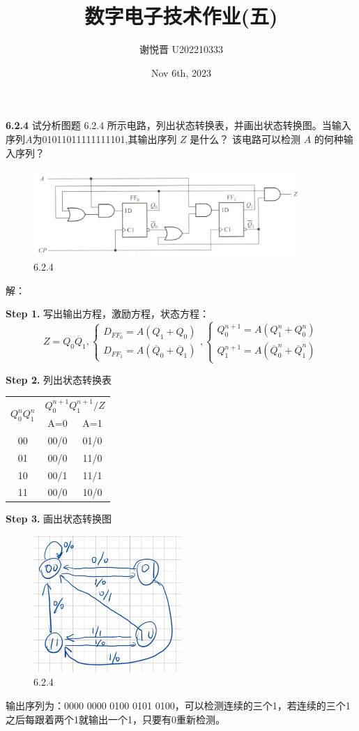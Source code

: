 \documentclass[a4paper,11pt,UTF8]{article}
\title{数字电子技术作业(五)}
\author{谢悦晋 \quad U202210333}
\date{Nov 6th, 2023 }
\begin{document}
\maketitle
\textbf{6.2.4} 试分析图题 6.2.4 所示电路，列出状态转换表，并画出状态转换图。当输入序列$A$为01011011111111101,其输出序列 $Z$ 是什么？ 该电路可以检测 $A$ 的何种输入序列？
\begin{figure}[H]
	\centering
	\includegraphics[width=0.9\textwidth]{6.2.4}
	\caption{6.2.4}
\end{figure}
\noindent 解：

\textbf{Step 1.} 写出输出方程，激励方程，状态方程：
$$
Z=Q_0\overline{Q}_1,
\begin{cases}
	D_{FF_0}=A(Q_1+{Q}_0)\\
	D_{FF_1}=A(\overline{Q}_0+\overline{Q}_1)
\end{cases},
\begin{cases}
	Q_{0}^{n+1}=A(Q_1^n+{Q}_0^n)\\
	Q_{1}^{n+1}=A(\overline{Q}_0^n+\overline{Q}^n_1)
\end{cases}
$$

\textbf{Step 2.} 列出状态转换表
\begin{table}[H]
	\centering
	\begin{tabular}{|c|c|c|}
		\hline
		\multirow{2}{*}{$Q_0^nQ_1^n$} & \multicolumn{2}{c|}{$Q_0^{n+1}Q_1^{n+1}/Z$}\\
		\cline{2-3}
		& A=0 & A=1\\
		\hline
		00 & 00/0 & 01/0\\
		01 & 00/0 & 11/0\\
		10 & 00/1 & 11/1\\
		11 & 00/0 & 10/0\\
		\hline
	\end{tabular}
\end{table}
\textbf{Step 3.} 画出状态转换图
\begin{figure}[H]
	\centering
	\includegraphics[width=0.5\textwidth]{6.2.4_1}
	\caption{6.2.4}
\end{figure}
输出序列为：0000 0000 0100 0101 0100，可以检测连续的三个1，若连续的三个1之后每跟着两个1就输出一个1，只要有0重新检测。
\end{document}
